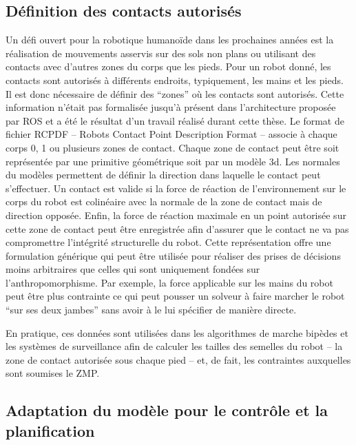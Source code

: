 \subsection{Définition des contacts autorisés}

Un défi ouvert pour la robotique humanoïde dans les prochaines années
est la réalisation de mouvements asservis sur des sols non plans ou
utilisant des contacts avec d'autres zones du corps que les
pieds. Pour un robot donné, les contacts sont autorisés à différents
endroits, typiquement, les mains et les pieds. Il est donc nécessaire
de définir des ``zones'' où les contacts sont autorisés. Cette
information n'était pas formalisée jusqu'à présent dans l'architecture
proposée par ROS et a été le résultat d'un travail réalisé durant
cette thèse. Le format de fichier RCPDF -- Robots Contact Point
Description Format -- associe à chaque corps 0, 1 ou plusieurs zones
de contact. Chaque zone de contact peut être soit représentée par une
primitive géométrique soit par un modèle 3d. Les normales du modèles
permettent de définir la direction dans laquelle le contact peut
s'effectuer. Un contact est valide si la force de réaction de
l'environnement sur le corps du robot est colinéaire avec la normale
de la zone de contact mais de direction opposée. Enfin, la force de
réaction maximale en un point autorisée sur cette zone de contact peut
être enregistrée afin d'assurer que le contact ne va pas compromettre
l'intégrité structurelle du robot. Cette représentation offre une
formulation générique qui peut être utilisée pour réaliser des prises
de décisions moins arbitraires que celles qui sont uniquement fondées
sur l'anthropomorphisme. Par exemple, la force applicable sur les
mains du robot peut être plus contrainte ce qui peut pousser un
solveur à faire marcher le robot ``sur ses deux jambes'' sans avoir à
le lui spécifier de manière directe.

En pratique, ces données sont utilisées dans les algorithmes de marche
bipèdes et les systèmes de surveillance afin de calculer les tailles
des semelles du robot -- la zone de contact autorisée sous chaque pied
-- et, de fait, les contraintes auxquelles sont soumises le ZMP.


\subsection{Adaptation du modèle pour le contrôle et la planification}

